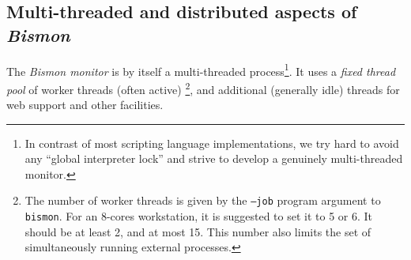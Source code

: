 \subsection{Multi-threaded and distributed aspects of \textit{Bismon}}

The \textit{Bismon monitor} is by itself a multi-threaded
process\footnote{In contrast of most scripting language
  implementations, we try hard to avoid any ``global interpreter
  lock'' and strive to develop a genuinely multi-threaded monitor.}.
It uses a \emph{fixed thread pool} of worker threads (often active)
\footnote{The number of worker threads is given by the \texttt{--job}
  program argument to \texttt{bismon}. For an 8-cores workstation, it
  is suggested to set it to 5 or 6. It should be at least 2, and at
  most 15. This number also limits the set of simultaneously running
  external processes.}, and additional (generally idle) threads for
web support and other facilities.



